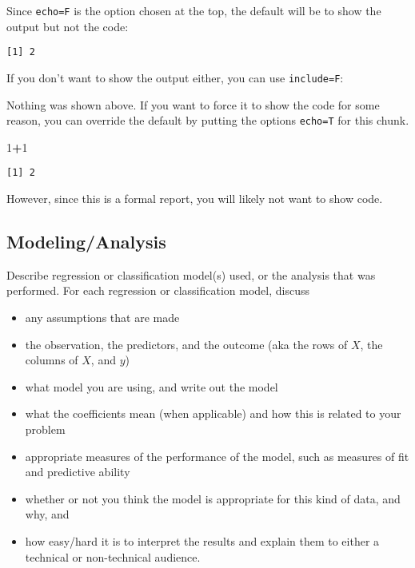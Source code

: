 \documentclass[
]{article}
\newenvironment{Shaded}{\begin{snugshade}}{\end{snugshade}}
\newcommand{\DecValTok}[1]{\textcolor[rgb]{0.00,0.00,0.81}{#1}}
\newcommand{\SpecialCharTok}[1]{\textcolor[rgb]{0.81,0.36,0.00}{\textbf{#1}}}
\providecommand{\tightlist}{%
  \setlength{\itemsep}{0pt}\setlength{\parskip}{0pt}}
\begin{document}
Since \texttt{echo=F} is the option chosen at the top, the default will
be to show the output but not the code:

\begin{verbatim}
[1] 2
\end{verbatim}

If you don't want to show the output either, you can use
\texttt{include=F}:

Nothing was shown above. If you want to force it to show the code for
some reason, you can override the default by putting the options
\texttt{echo=T} for this chunk.

\begin{Shaded}
\begin{Highlighting}[]
\DecValTok{1}\SpecialCharTok{+}\DecValTok{1}
\end{Highlighting}
\end{Shaded}

\begin{verbatim}
[1] 2
\end{verbatim}

However, since this is a formal report, you will likely not want to show
code.

\hypertarget{modelinganalysis}{%
\subsection{Modeling/Analysis}\label{modelinganalysis}}

Describe regression or classification model(s) used, or the analysis
that was performed. For each regression or classification model, discuss

\begin{itemize}
\tightlist
\item
  any assumptions that are made
\item
  the observation, the predictors, and the outcome (aka the rows of
  \(X\), the columns of \(X\), and \(y\))
\item
  what model you are using, and write out the model
\item
  what the coefficients mean (when applicable) and how this is related
  to your problem
\item
  appropriate measures of the performance of the model, such as measures
  of fit and predictive ability
\item
  whether or not you think the model is appropriate for this kind of
  data, and why, and
\item
  how easy/hard it is to interpret the results and explain them to
  either a technical or non-technical audience.
\end{itemize}
\end{document}
